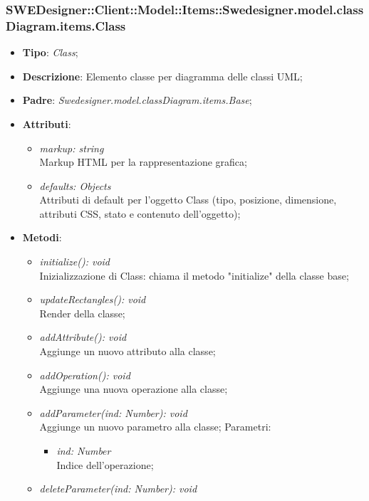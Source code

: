 \documentclass[../DefinizioneDiProdotto.tex]{subfiles}
\begin{document}
			\subsubsection{SWEDesigner::Client::Model::Items::Swedesigner.model.classDiagram.items.Class}
			\hypertarget{SWEDesigner::Client::Model::Items::Swedesigner.model.classDiagram.items.Class}{}
			\begin{itemize}
				\item \textbf{Tipo}: \emph{Class};
				\item \textbf{Descrizione}: Elemento classe per diagramma delle classi UML;
				\item \textbf{Padre}: \emph{Swedesigner.model.classDiagram.items.Base};
				\item \textbf{Attributi}:
				\begin{itemize}
					\item \emph{markup: string}\\
					Markup HTML per la rappresentazione grafica;
					\item \emph{defaults: Objects}\\
					Attributi di default per l'oggetto Class (tipo, posizione, dimensione, attributi CSS, stato e contenuto dell'oggetto);
				\end{itemize}
				\item \textbf{Metodi}:
				\begin{itemize}
					\item \emph{initialize(): void}\\
					Inizializzazione di Class: chiama il metodo "initialize" della classe base;
					\item \emph{updateRectangles(): void}\\
					Render della classe;
					\item \emph{addAttribute(): void}\\
					Aggiunge un nuovo attributo alla classe;
					\item \emph{addOperation(): void}\\
					Aggiunge una nuova operazione alla classe;	
					\item \emph{addParameter(ind: Number): void}\\
					Aggiunge un nuovo parametro alla classe;
					Parametri:
					\begin{itemize}
						\item \emph{ind: Number} \\
						Indice dell'operazione;
					\end{itemize}
					\item \emph{deleteParameter(ind: Number): void}\\

\end{itemize}
\end{itemize}
\end{document}
